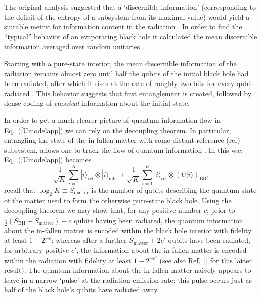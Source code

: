 \documentclass[aps,showpacs,prl,12pt]{revtex4}
\begin{document}
The original analysis suggested that a `discernible information'
(corresponding to the deficit of the entropy of a subsystem from
its maximal value) would yield a suitable metric for information
content in the radiation \cite{Page93app}. In order to find the
``typical'' behavior of an evaporating black hole it calculated
the mean discernible information averaged over random
unitaries \cite{Page93app}.

Starting with a pure-state interior, the mean discernible information
of the radiation remains almost zero until half the qubits of the
initial black hole had been radiated, after which it rises at
the rate of roughly two bits for every qubit radiated \cite{Page93app}.
This behavior suggests that first entanglement is created, followed by
dense coding \cite{Bennett92app} of {\it classical\/} information about the
initial state.

In order to get a much clearer picture of quantum information flow
in Eq.~(\ref{Umodelapp}) we can rely on the decoupling theorem.
In particular, entangling the state of the in-fallen matter with some
distant reference (ref) subsystem, allows one to track the flow of
quantum information \cite{meapp,Hayden07app}. In this way Eq.~(\ref{Umodelapp})
becomes
\begin{equation}
\frac{1}{\sqrt{K}}\sum_{i=1}^{K}
|i\rangle_{\text{ref}}\otimes|i\rangle_{\text{int}}\rightarrow
\frac{1}{\sqrt{K}}\sum_{i=1}^{K}
|i\rangle_{\text{ref}}\otimes(U|i\rangle)_{\text{BR}},
\label{HaydenPreskill}
\end{equation}
recall that $\log_2 K\equiv S_{\text{matter}}$ is the number of qubits
describing the quantum state of the matter used to form the otherwise
pure-state black hole. Using the decoupling theorem \cite{Abey06app}
we may show that, for any positive number $c$, prior to
$\frac{1}{2}(S_{\text{BH}}-S_{\text{matter}})-c$ qubits having been
radiated, the quantum information about the in-fallen matter
is encoded within the black hole interior with fidelity at least
$1-2^{-c}$; whereas after a further $S_{\text{matter}} + 2c'$ qubits
have been radiated, for arbitrary positive $c'$, the information
about the in-fallen matter is encoded within the radiation with
fidelity at least $1-2^{-c'}$ (see also Ref.~[]
for this latter result). The quantum information about the in-fallen
matter naively appears to leave in a narrow `pulse' at the radiation
emission rate; this pulse occurs just as half of the black hole's
qubits have radiated away.
\end{document}
